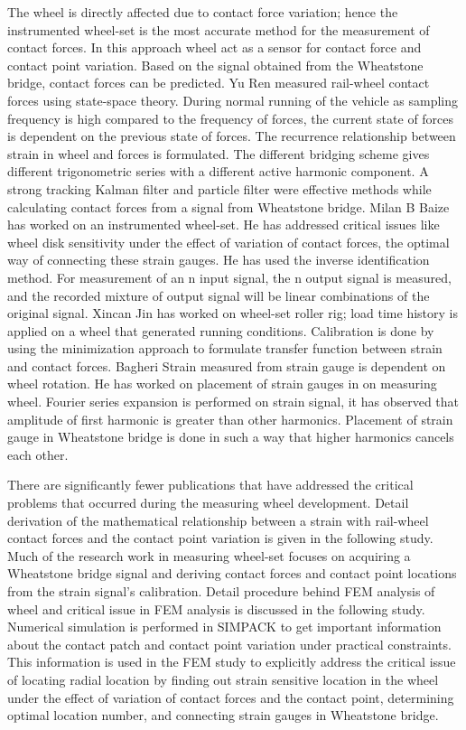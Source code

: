 \documentclass[]{interact}
\theoremstyle{plain}%
\theoremstyle{definition}
\theoremstyle{remark}
\begin{document}
The wheel is directly affected due to contact force variation; hence the instrumented wheel-set is the most accurate method for the measurement of contact forces. In this approach wheel act as a sensor for contact force and contact point variation. Based on the signal obtained from the Wheatstone bridge, contact forces can be predicted. Yu Ren \cite{Yu}  measured rail-wheel contact forces using state-space theory. During normal running of the vehicle as sampling frequency is high compared to the frequency of forces, the current state of forces is dependent on the previous state of forces. The recurrence relationship between strain in wheel and forces is formulated. The different bridging scheme gives different trigonometric series with a different active harmonic component. A strong tracking Kalman filter and particle filter were effective methods while calculating contact forces from a signal from Wheatstone bridge. Milan B Baize \cite{Milan}  has worked on an instrumented wheel-set. He has addressed critical issues like wheel disk sensitivity under the effect of variation of contact forces, the optimal way of connecting these strain gauges. He has used the inverse identification method. For measurement of an n input signal, the n output signal is measured, and the recorded mixture of output signal will be linear combinations of the original signal. Xincan Jin \cite{Xincan}  has worked on wheel-set roller rig; load time history is applied on a wheel that generated running conditions. Calibration is done by using the minimization approach to formulate transfer function between strain and contact forces. Bagheri \cite{Bagheri}  Strain measured from strain gauge is dependent on wheel rotation. He has worked on placement of strain gauges in on measuring wheel. Fourier series expansion is performed on strain signal, it has observed that amplitude of first harmonic is greater than other harmonics. Placement of strain gauge in Wheatstone bridge is done in such a way that higher harmonics cancels each other.
      
  There are significantly fewer publications that have addressed the critical problems that occurred during the measuring wheel development. Detail derivation of the mathematical relationship between a strain with rail-wheel contact forces and the contact point variation is given in the following study. Much of the research work in measuring wheel-set focuses on acquiring a Wheatstone bridge signal and deriving contact forces and contact point locations from the strain signal's calibration. Detail procedure behind FEM analysis of wheel and critical issue in FEM analysis is discussed in the following study. Numerical simulation is performed in SIMPACK to get important information about the contact patch and contact point variation under practical constraints. This information is used in the FEM study to explicitly address the critical issue of locating radial location by finding out strain sensitive location in the wheel under the effect of variation of contact forces and the contact point, determining optimal location number, and connecting strain gauges in Wheatstone bridge. 
\end{document}
